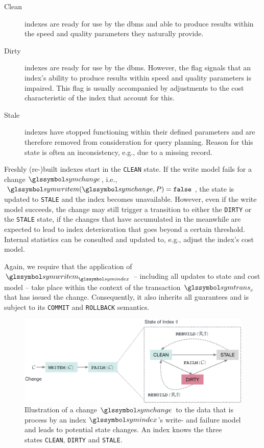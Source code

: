 \begin{description}
    \item[Clean] indexes are ready for use by the \acrshort{dbms} and able to produce results within the speed and quality parameters they naturally provide.
    \item[Dirty] indexes are ready for use by the \acrshort{dbms}. However, the flag signals that an index's ability to produce results within speed and quality parameters is impaired. This flag is usually accompanied by adjustments to the cost characteristic of the index that account for this.
    \item[Stale] indexes have stopped functioning within their defined parameters and are therefore removed from consideration for query planning. Reason for this state is often an inconsistency, e.g., due to a missing record.
\end{description}

Freshly (re-)built indexes start in the \texttt{CLEAN} state. If the write model fails for a change $\symchange$, i.e., $\symwritem(\symchange,P) = \mathtt{false}$, the state is updated to \texttt{STALE} and the index becomes unavailable. However, even if the write model succeeds, the change may still trigger a transition to either the \texttt{DIRTY} or the \texttt{STALE} state, if the changes that have accumulated in the meanwhile are expected to lead to index deterioration that goes beyond a certain threshold. Internal statistics can be consulted and updated to, e.g., adjust the index's cost model.

Again, we require that the application of $\symwritem_{\symindex}$ -- including all updates to state and cost model -- take place within the context of the transaction $\symtrans_c$ that has issued the change. Consequently, it also inherits all guarantees and is subject to its \texttt{COMMIT} and \texttt{ROLLBACK} semantics.

\begin{figure}[bt]
    \centering
    \includegraphics[width=\textwidth]{figures/failure_model.eps}
    \caption{Illustration of a change $\symchange$ to the data that is process by an index $\symindex$'s write- and failure model and leads to potential state changes. An index knows the three states \texttt{CLEAN}, \texttt{DIRTY} and \texttt{STALE}.}
    \label{figure:failure_model}
\end{figure}

